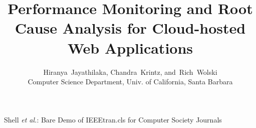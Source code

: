 \documentclass[10pt,journal,compsoc]{IEEEtran}
\begin{document}




%

\title{Performance Monitoring and Root Cause Analysis for Cloud-hosted Web Applications}
\author{Hiranya~Jayathilaka,
        Chandra~Krintz,
        and~Rich~Wolski\\
Computer Science Department, Univ. of California, Santa Barbara}

%                                                                                                         
{Shell \MakeLowercase{\textit{et al.}}: Bare Demo of IEEEtran.cls for Computer Society Journals}

\end{document}
